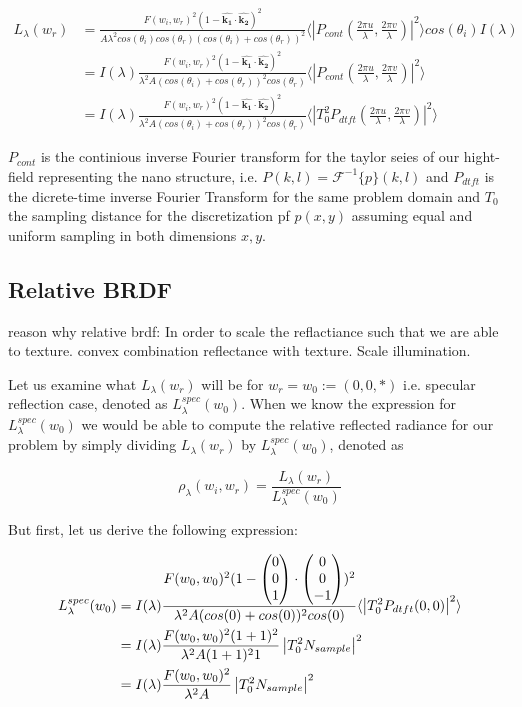 \begin{align*}
L_{\lambda}(w_r) 
& = \frac{F(w_i, w_r)^2 (1-\hat{\mathbf{k_1}}\cdot\hat{ \mathbf{k_2}})^2}{A \lambda^2 cos(\theta_i)cos(\theta_r)  (cos(\theta_i)+cos(\theta_r))^2} \langle \left|P_{cont}(\frac{2\pi u}{\lambda}, \frac{2\pi v}{\lambda})  \right|^2\rangle cos(\theta_i) I(\lambda) \\
& = I(\lambda) \frac{F(w_i, w_r)^2 (1-\hat{\mathbf{k_1}}\cdot\hat{\mathbf{k_2}})^2}{\lambda^2 A (cos(\theta_i)+cos(\theta_r))^2 cos(\theta_r)} \langle \left|P_{cont}(\frac{2\pi u}{\lambda}, \frac{2\pi v}{\lambda})  \right|^2\rangle \\
& = I(\lambda) \frac{F(w_i, w_r)^2 (1-\hat{\mathbf{k_1}}\cdot\hat{\mathbf{k_2}})^2}{\lambda^2 A (cos(\theta_i)+cos(\theta_r))^2 cos(\theta_r)} \langle \left|T_0^2 P_{dtft}(\frac{2\pi u}{\lambda}, \frac{2\pi v}{\lambda})  \right|^2\rangle
\end{align*}

$P_{cont}$ is the continious inverse Fourier transform for the taylor seies of our hight-field representing the nano structure, i.e. $P(k,l) = \mathcal{F}^{-1}\{p\}(k,l)$ and $P_{dtft}$ is the dicrete-time inverse Fourier Transform for the same problem domain and $T_0$ the sampling distance for the discretization pf $p(x,y)$ assuming equal and uniform sampling in both dimensions $x,y$.

\subsection{Relative BRDF}
reason why relative brdf: In order to scale the reflactiance such that we are able to texture. 
convex combination reflectance with texture. Scale illumination.

Let us examine what $L_\lambda(w_r)$ will be for $w_r = w_0 := (0,0,*)$ i.e. specular reflection case, denoted as $L_\lambda^{spec}(w_0)$. 
When we know the expression for $L_\lambda^{spec}(w_0)$ we would be able to compute the relative reflected radiance for our problem by simply dividing $L_\lambda(w_r)$ by $L_\lambda^{spec}(w_0)$, denoted as 

\begin{equation}
    \rho_\lambda(w_i,w_r) = \frac{L_\lambda(w_r)}{L_\lambda^{spec}(w_0)}
\end{equation}

But first, let us derive the following expression:

\begin{align*}
L_\lambda^{spec}(w_0) 
& = I(\lambda) \frac{F(w_0, w_0)^2 (1-\colvec[0]{0}{1}\cdot\colvec[0]{0}{-1})^2}{\lambda^2 A (cos(0)+cos(0))^2 cos(0)} \langle \left|T_0^2 P_{dtft}(0,0)  \right|^2\rangle \\
& = I(\lambda) \frac{F(w_0, w_0)^2 (1+1)^2}{\lambda^2 A (1+1)^2 1}\left| T_0^2 N_{sample} \right|^2 \\
& = I(\lambda) \frac{F(w_0, w_0)^2}{\lambda^2 A}\left| T_0^2 N_{sample} \right|^2 
\end{align*}

